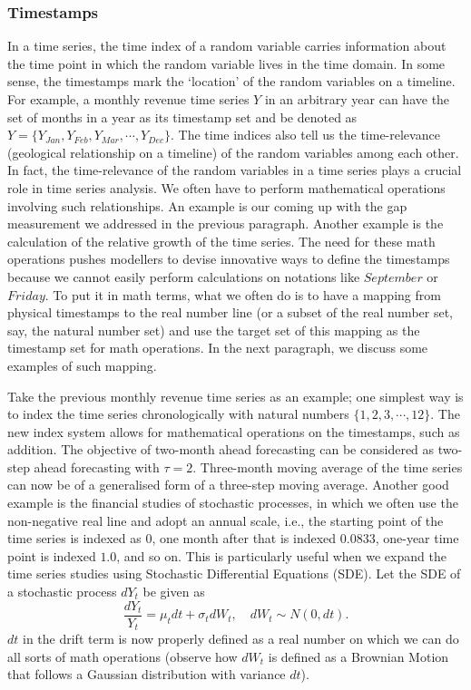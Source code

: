 \subsubsection{Timestamps}
In a time series, the time index of a random variable carries information about the time point in which the random variable lives in the time domain. In some sense, the timestamps mark the `location' of the random variables on a timeline. For example, a monthly revenue time series $Y$ in an arbitrary year can have the set of months in a year as its timestamp set and be denoted as $Y = \{ Y_{Jan}, Y_{Feb}, Y_{Mar}, \cdots, Y_{Dec} \}$. The time indices also tell us the time-relevance (geological relationship on a timeline) of the random variables among each other. In fact, the time-relevance of the random variables in a time series plays a crucial role in time series analysis. We often have to perform mathematical operations involving such relationships. An example is our coming up with the gap measurement we addressed in the previous paragraph. Another example is the calculation of the relative growth of the time series. The need for these math operations pushes modellers to devise innovative ways to define the timestamps because we cannot easily perform calculations on notations like $September$ or $Friday$. To put it in math terms, what we often do is to have a mapping from physical timestamps to the real number line (or a subset of the real number set, say, the natural number set) and use the target set of this mapping as the timestamp set for math operations. In the next paragraph, we discuss some examples of such mapping.

Take the previous monthly revenue time series as an example; one simplest way is to index the time series chronologically with natural numbers $\{ 1, 2, 3, \cdots, 12 \}$. The new index system allows for mathematical operations on the timestamps, such as addition. The objective of two-month ahead forecasting can be considered as two-step ahead forecasting with $\tau = 2$. Three-month moving average of the time series can now be of a generalised form of a three-step moving average. Another good example is the financial studies of stochastic processes, in which we often use the non-negative real line and adopt an annual scale, i.e., the starting point of the time series is indexed as $0$, one month after that is indexed $0.0833$, one-year time point is indexed $1.0$, and so on. This is particularly useful when we expand the time series studies using Stochastic Differential Equations (SDE). Let the SDE of a stochastic process $dY_t$ be given as
\begin{equation*}
    \frac{dY_t}{Y_t} = \mu_t dt + \sigma_t dW_t, \quad dW_t \sim N(0, dt).
\end{equation*}
$dt$ in the drift term is now properly defined as a real number on which we can do all sorts of math operations (observe how $dW_t$ is defined as a Brownian Motion that follows a Gaussian distribution with variance $dt$).

